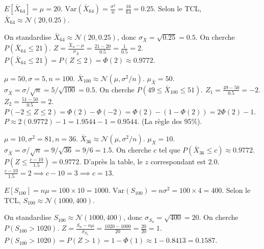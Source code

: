 \begin{correctionbox}
$E[\bar{X}_{64}] = \mu = 20$.
$\text{Var}(\bar{X}_{64}) = \frac{\sigma^2}{n} = \frac{16}{64} = 0.25$.
Selon le TCL, $\bar{X}_{64} \approx \mathcal{N}(20, 0.25)$.
\end{correctionbox}

\begin{correctionbox}
On standardise $\bar{X}_{64} \approx \mathcal{N}(20, 0.25)$, donc $\sigma_{\bar{X}} = \sqrt{0.25} = 0.5$.
On cherche $P(\bar{X}_{64} \le 21)$.
$Z = \frac{\bar{X}_n - \mu}{\sigma_{\bar{X}}} = \frac{21 - 20}{0.5} = \frac{1}{0.5} = 2$.
$P(\bar{X}_{64} \le 21) = P(Z \le 2) = \Phi(2) \approx 0.9772$.
\end{correctionbox}

\begin{correctionbox}
$\mu=50, \sigma=5, n=100$. $\bar{X}_{100} \approx \mathcal{N}(\mu, \sigma^2/n)$.
$\mu_{\bar{X}} = 50$. $\sigma_{\bar{X}} = \sigma / \sqrt{n} = 5 / \sqrt{100} = 0.5$.
On cherche $P(49 \le \bar{X}_{100} \le 51)$.
$Z_1 = \frac{49 - 50}{0.5} = -2$. $Z_2 = \frac{51 - 50}{0.5} = 2$.
$P(-2 \le Z \le 2) = \Phi(2) - \Phi(-2) = \Phi(2) - (1 - \Phi(2)) = 2\Phi(2) - 1$.
$P \approx 2(0.9772) - 1 = 1.9544 - 1 = 0.9544$. (La règle des 95\%).
\end{correctionbox}

\begin{correctionbox}
$\mu=10, \sigma^2=81, n=36$. $\bar{X}_{36} \approx \mathcal{N}(\mu, \sigma^2/n)$.
$\mu_{\bar{X}} = 10$. $\sigma_{\bar{X}} = \sigma / \sqrt{n} = 9 / \sqrt{36} = 9 / 6 = 1.5$.
On cherche $c$ tel que $P(\bar{X}_{36} \le c) \approx 0.9772$.
$P(Z \le \frac{c - 10}{1.5}) = 0.9772$.
D'après la table, le $z$ correspondant est $2.0$.
$\frac{c - 10}{1.5} = 2 \implies c - 10 = 3 \implies c = 13$.
\end{correctionbox}

\begin{correctionbox}
$E[S_{100}] = n\mu = 100 \times 10 = 1000$.
$\text{Var}(S_{100}) = n\sigma^2 = 100 \times 4 = 400$.
Selon le TCL, $S_{100} \approx \mathcal{N}(1000, 400)$.
\end{correctionbox}

\begin{correctionbox}
On standardise $S_{100} \approx \mathcal{N}(1000, 400)$, donc $\sigma_{S_n} = \sqrt{400} = 20$.
On cherche $P(S_{100} > 1020)$.
$Z = \frac{S_n - n\mu}{\sigma_{S_n}} = \frac{1020 - 1000}{20} = \frac{20}{20} = 1$.
$P(S_{100} > 1020) = P(Z > 1) = 1 - \Phi(1) \approx 1 - 0.8413 = 0.1587$.
\end{correctionbox}

